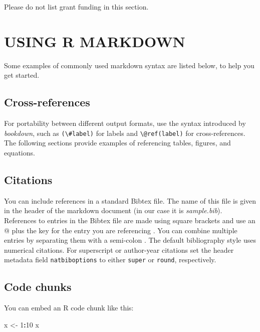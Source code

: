\documentclass[9pt,a4paper,]{extarticle}
\newenvironment{Shaded}{\begin{snugshade}}{\end{snugshade}}
\newcommand{\DecValTok}[1]{\textcolor[rgb]{0.00,0.00,0.81}{#1}}
\newcommand{\NormalTok}[1]{#1}
\newcommand{\OtherTok}[1]{\textcolor[rgb]{0.56,0.35,0.01}{#1}}
\newcommand{\SpecialCharTok}[1]{\textcolor[rgb]{0.81,0.36,0.00}{\textbf{#1}}}
\begin{document}
Please do not list grant funding in this section.

\hypertarget{using-r-markdown}{%
\section{USING R MARKDOWN}\label{using-r-markdown}}

Some examples of commonly used markdown syntax are listed below, to help you get started.

\hypertarget{cross-references}{%
\subsection{Cross-references}\label{cross-references}}

For portability between different output formats, use the syntax introduced by \emph{bookdown}, such as \texttt{(\textbackslash{}\#label)} for labels and \texttt{\textbackslash{}@ref(label)} for cross-references. The following sections provide examples of referencing tables, figures, and equations.

\hypertarget{citations}{%
\subsection{Citations}\label{citations}}

You can include references in a standard Bibtex file. The name of this file is given in the header of the markdown document (in our case it is \emph{sample.bib}). References to entries in the Bibtex file are made using square brackets and use an @ plus the key for the entry you are referencing \citep{Smith:2012qr}. You can combine multiple entries by separating them with a semi-colon \citep{Smith:2012qr, Smith:2013jd}.
The default bibliography style uses numerical citations. For superscript or author-year citations set the header metadata field \texttt{natbiboptions} to either \texttt{super} or \texttt{round}, respectively.

\hypertarget{code-chunks}{%
\subsection{Code chunks}\label{code-chunks}}

You can embed an R code chunk like this:

\begin{Shaded}
\begin{Highlighting}[]
\NormalTok{x }\OtherTok{\textless{}{-}} \DecValTok{1}\SpecialCharTok{:}\DecValTok{10}
\NormalTok{x}
\end{Highlighting}
\end{Shaded}
\end{document}
